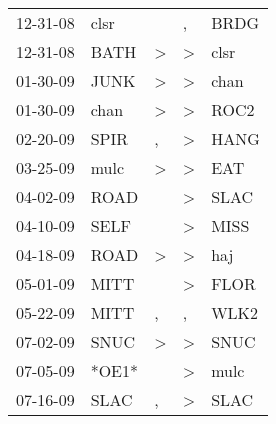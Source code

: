 \begin{supertabular}{p{0.07\textwidth}p{0.06\textwidth}p{0.02\textwidth}p{0.02\textwidth}p{0.06\textwidth}}
          12-31-08\textsuperscript{} &           clsr\textsuperscript{} &                  &                , &           BRDG\textsuperscript{} \\
          12-31-08\textsuperscript{} &           BATH\textsuperscript{} &     \textgreater &     \textgreater &           clsr\textsuperscript{} \\
          01-30-09\textsuperscript{} &           JUNK\textsuperscript{} &     \textgreater &     \textgreater &           chan\textsuperscript{} \\
          01-30-09\textsuperscript{} &           chan\textsuperscript{} &     \textgreater &     \textgreater &           ROC2\textsuperscript{} \\
          02-20-09\textsuperscript{} &           SPIR\textsuperscript{} &                , &     \textgreater &           HANG\textsuperscript{} \\
          03-25-09\textsuperscript{} &           mulc\textsuperscript{} &     \textgreater &     \textgreater &            EAT\textsuperscript{} \\
          04-02-09\textsuperscript{} &           ROAD\textsuperscript{} &                  &     \textgreater &           SLAC\textsuperscript{} \\
          04-10-09\textsuperscript{} &           SELF\textsuperscript{} &                  &     \textgreater &           MISS\textsuperscript{} \\
          04-18-09\textsuperscript{} &           ROAD\textsuperscript{} &     \textgreater &     \textgreater &            haj\textsuperscript{} \\
          05-01-09\textsuperscript{} &           MITT\textsuperscript{} &                  &     \textgreater &           FLOR\textsuperscript{} \\
          05-22-09\textsuperscript{} &           MITT\textsuperscript{} &                , &                , &           WLK2\textsuperscript{} \\
          07-02-09\textsuperscript{} &           SNUC\textsuperscript{} &     \textgreater &     \textgreater &           SNUC\textsuperscript{} \\
          07-05-09\textsuperscript{} &                            *OE1* &                  &     \textgreater &           mulc\textsuperscript{} \\
          07-16-09\textsuperscript{} &           SLAC\textsuperscript{} &                , &     \textgreater &           SLAC\textsuperscript{} \\

\end{supertabular}
